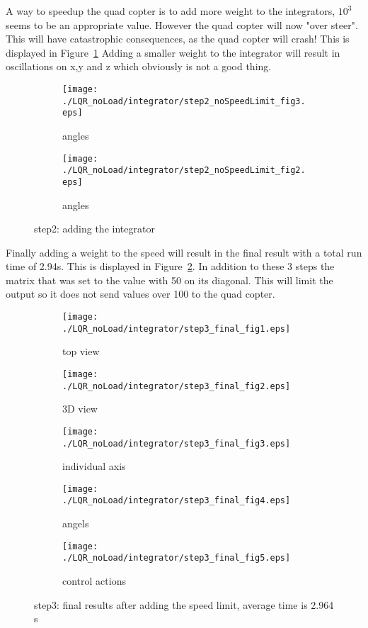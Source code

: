 A way to speedup the quad copter is to add more weight to the integrators, $10^3$ seems to be an appropriate value. However the quad copter will now "over steer". This will have catastrophic consequences, as the quad copter will  crash! This is displayed in Figure~\ref{fig:step2 integrator} Adding a smaller weight to the integrator will result in oscillations on x,y and z which obviously is not a good thing.

\begin{figure}[H]
	\centering
	\begin{subfigure}[b]{0.3\textwidth}
		\texttt{[image: ./LQR\_noLoad/integrator/step2\_noSpeedLimit\_fig3.eps]}
		\caption{angles}
	\end{subfigure}
	\begin{subfigure}[b]{0.3\textwidth}
		\texttt{[image: ./LQR\_noLoad/integrator/step2\_noSpeedLimit\_fig2.eps]}
		\caption{angles}
	\end{subfigure}
	\caption{step2: adding the integrator}\label{fig:step2 integrator}
\end{figure}

Finally adding a weight to the speed will result in the final result with a total run time of 2.94s. This is displayed in Figure~\ref{fig:step3 integrator}. In addition to these 3 steps the matrix that was set to the value with 50 on its diagonal. This will limit the output so it does not send values over 100 to the quad copter.

\begin{figure}[H]
	\centering
	\begin{subfigure}[b]{0.3\textwidth}
		\texttt{[image: ./LQR\_noLoad/integrator/step3\_final\_fig1.eps]}
		\caption{top view}
	\end{subfigure}
	\begin{subfigure}[b]{0.3\textwidth}
		\texttt{[image: ./LQR\_noLoad/integrator/step3\_final\_fig2.eps]}
		\caption{3D view}
	\end{subfigure}
	\begin{subfigure}[b]{0.3\textwidth}
		\texttt{[image: ./LQR\_noLoad/integrator/step3\_final\_fig3.eps]}
		\caption{individual axis}
	\end{subfigure}
	\begin{subfigure}[b]{0.3\textwidth}
		\texttt{[image: ./LQR\_noLoad/integrator/step3\_final\_fig4.eps]}
		\caption{angels}
	\end{subfigure}
	\begin{subfigure}[b]{0.3\textwidth}
		\texttt{[image: ./LQR\_noLoad/integrator/step3\_final\_fig5.eps]}
		\caption{control actions}
	\end{subfigure}
	\caption{step3: final results after adding the speed limit, average time is 2.964 s}\label{fig:step3 integrator}
\end{figure}

